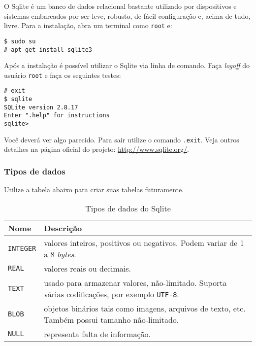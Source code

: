 O Sqlite é um banco de dados relacional bastante utilizado por dispositivos e sistemas embarcados por
ser leve, robusto, de fácil configuração e, acima de tudo, livre. Para a instalação, abra um terminal
como \texttt{root} e:

\begin{flushleft}
\texttt{\$ sudo su \\
\# apt-get install sqlite3 \\}
\end{flushleft}

Após a instalação é possível utilizar o Sqlite via linha de comando. Faça \textit{logoff} do usuário
\texttt{root} e faça os seguintes testes:

\begin{flushleft}
\texttt{\# exit \\
\$ sqlite \\
SQLite version 2.8.17\\
Enter ".help" for instructions\\
sqlite>\\}
\end{flushleft}

Você deverá ver algo parecido. Para sair utilize o comando \texttt{.exit}. Veja outros detalhes na página
oficial do projeto: \url{http://www.sqlite.org/}.

\subsubsection{Tipos de dados}

Utilize a tabela abaixo para criar suas tabelas futuramente.

\begin{table}[H]
\begin{tabularx}{400pt}{lX}
\hline
\textbf{Nome} & \textbf{Descrição} \\
\hline
\texttt{INTEGER} & valores inteiros, positivos ou negativos. Podem variar de 1 a 8 \textit{bytes}.\\
\texttt{REAL} & valores reais ou decimais.\\
\texttt{TEXT} & usado para armazenar valores, não-limitado. Suporta várias codificações, por exemplo \texttt{UTF-8}.\\
\texttt{BLOB} & objetos binários tais como imagens, arquivos de texto, etc. Também possui tamanho não-limitado.\\
\texttt{NULL} & representa falta de informação.\\
\hline
\end{tabularx}
\caption{Tipos de dados do Sqlite}
\end{table}

